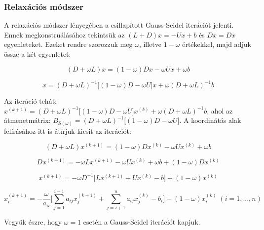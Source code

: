 \documentclass[margin=0px]{article}
\begin{document}
	\subsubsection{Relaxációs módszer}
	
	A relaxációs módszer lényegében a csillapított Gauss-Seidel iterációt jelenti. Ennek megkonstruálásához
	tekintsük az $(L+D)x = -Ux + b$ és $Dx = Dx$ egyenleteket. Ezeket rendre szorozzuk meg $\omega$, illetve
	$1 - \omega$ értékekkel, majd adjuk össze a két	egyenletet:	
	
	\begin{displaymath}
		(D+\omega L)x = (1 - \omega)Dx -\omega Ux + \omega b
	\end{displaymath}
	 
	\begin{displaymath}
		x = (D+\omega L)^{-1}\big[(1 - \omega)D -\omega U \big]x + \omega (D+\omega L)^{-1}b
	\end{displaymath}
	
	Az iteráció tehát: $x^{(k+1)} = (D+\omega L)^{-1}\big[(1 - \omega)D -\omega U \big]x^{(k)} + \omega (D+\omega L)^{-1}b$, ahol
	az átmenetmátrix: $B_{S(\omega)}= (D+\omega L)^{-1}\big[(1 - \omega)D -\omega U \big]$. A koordinátás alak
	felírásához itt is átírjuk kicsit az iterációt:
	
	\begin{displaymath}
		(D + \omega L)x^{(k+1)} = (1 - \omega)Dx^{(k)} -\omega Ux^{(k)} + \omega b
	\end{displaymath}
	
	\begin{displaymath}
		Dx^{(k+1)} =  -\omega Lx^{(k+1)} -\omega Ux^{(k)} + \omega b + (1 - \omega)Dx^{(k)}
	\end{displaymath}
	
	\begin{displaymath}
		x^{(k+1)} = -\omega D^{-1} \big[Lx^{(k+1)} + Ux^{(k)} - b \big] + (1 - \omega)x^{(k)}
	\end{displaymath}
	
	\begin{displaymath}
		x^{(k+1)}_{i} =
		-\frac{\omega}{a_{ii}}
		\Bigg[
		\sum_{j=1}^{i-1} a_{ij}x_{j}^{(k+1)} +
		\sum_{j=i+1}^{n} a_{ij}x_{j}^{(k)}	-
		b_{i}
		\Bigg] +
		(1 - \omega) x_{i}^{(k)}
		\; (i = 1, ..., n)
	\end{displaymath}
	
	\noindent Vegyük észre, hogy $\omega = 1$ esetén a Gauss-Seidel iterációt kapjuk.\\
	
\end{document}
